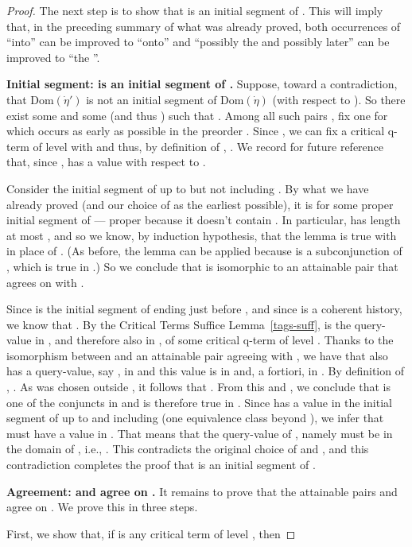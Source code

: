 \documentclass{LMCS}
\theoremstyle{definition}
\newcommand{\ans}{\dot}
\newcommand{\dom}[1]{\ensuremath{{\text{Dom}}(#1)}}
\begin{document}
\begin{proof}
The next step is to show that  is an initial segment of
.  This will imply that, in the preceding summary of what was
already proved, both occurrences of ``into'' can be improved to
``onto'' and ``possibly the  and possibly later'' can be
improved to ``the ''.

\medskip\noindent\textbf{Initial segment:  is an initial
segment of .}  Suppose, toward a contradiction, that
\dom{\ans\eta'} is not an initial segment of \dom{\ans\eta} (with
respect to ).  So there exist some
 and some 
(and thus ) such that .
Among all such pairs , fix one for which  occurs as early as
possible in the preorder .  Since , we
can fix a critical q-term  of level  with
 and thus, by definition of ,
.  We record for future reference that, since
,  has a value with respect to
.

Consider the initial segment of  up to but not including . By
what we have already proved (and our choice of  as the earliest
possible), it is  for some proper initial segment  of
 --- proper because it doesn't contain .  In particular,
 has length at most , and so we know, by induction
hypothesis, that the lemma is true with  in place of .
(As before, the lemma can be applied because  is a
subconjunction of , which is true in .)  So
we conclude that  is isomorphic to an attainable pair that
agrees on  with .

Since  is the initial segment of  ending just before
, and since  is a coherent history, we know that
.  By the Critical Terms Suffice
Lemma~\ref{tags-suff},  is the query-value in , and
therefore also in , of some critical q-term  of level
. Thanks to the isomorphism between  and an
attainable pair agreeing with , we have that  also
has a query-value, say , in  and this value is in
 and, a fortiori, in .  By
definition of , . As  was chosen outside
, it follows that
. From this and , we
conclude that  is one of the conjuncts in 
and is therefore true in . Since  has a value in the
initial segment of  up to and including  (one equivalence
class beyond ), we infer that  must have a value in
.  That means that the query-value of , namely
 must be in the domain of , i.e., .
This contradicts the original choice of  and , and this
contradiction completes the proof that  is an initial segment
of .

\medskip\noindent\textbf{Agreement:  and  agree
  on .}
It remains to prove that the attainable pairs  and
 agree on .  We prove this in three steps.

First, we show that, if  is any critical term of level , then


\end{proof}
\end{document}
